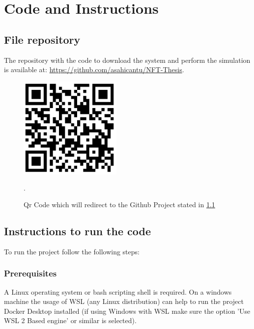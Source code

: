 \chapter{Code and Instructions}
\label{apx:main}

\section{File repository}
\label{FileRep}
The repository with the code to download the system and perform the simulation is available at:
\url{https://github.com/asahicantu/NFT-Thesis}.

 \begin{figure}[!h]
        \centering
        \includegraphics[width=5cm]{img/QrCode.png}
        \caption{Qr Code which will redirect to the Github Project stated in \ref{FileRep}}.
        \label{fig:QRCode}
\end{figure}

\section{Instructions to run the code}
To run the project follow the following steps:

\subsection{Prerequisites}
A Linux operating system or bash scripting shell is required.
On a windows machine the usage of \ac{WSL} (any Linux distribution) can help to run the project
Docker Desktop installed (if using Windows with \ac{WSL} make sure the option 'Use WSL 2 Based engine' or similar is selected).

